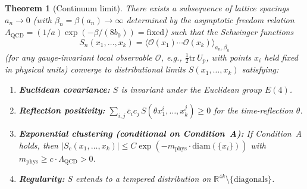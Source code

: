 \documentclass[11pt]{article}
\newtheorem{theorem}{Theorem}[section]
\theoremstyle{definition}
\newcommand{\tr}{\mathrm{tr}}
\newcommand{\R}{\mathbb{R}}
\newcommand{\Lam}{\Lambda_{\mathrm{QCD}}}
\begin{document}
\begin{theorem}[Continuum limit]\label{thm:continuum}
There exists a subsequence of lattice spacings $a_n\to 0$ (with
$\beta_n=\beta(a_n)\to\infty$ determined by the asymptotic freedom
relation $\Lam=(1/a)\exp(-\beta/(8b_0))=\mathrm{fixed}$) such that
the Schwinger functions
\[
S_n(x_1,\ldots,x_k)=\langle\mathcal{O}(x_1)\cdots\mathcal{O}(x_k)
\rangle_{a_n,\beta_n}
\]
(for any gauge-invariant local observable $\mathcal{O}$, e.g.,
$\frac{1}{2}\tr\,U_p$, with points $x_i$ held fixed in physical
units) converge to distributional limits $S(x_1,\ldots,x_k)$
satisfying:
\begin{enumerate}[nosep,label=(\roman*)]
\item \textbf{Euclidean covariance:} $S$ is invariant under the
Euclidean group $E(4)$.
\item \textbf{Reflection positivity:}
$\sum_{i,j}\bar c_i c_j\,S(\theta x_1^i,\ldots,x_k^j)\ge 0$
for the time-reflection $\theta$.
\item \textbf{Exponential clustering (conditional on Condition~A):}
If Condition~A holds, then
$|S_c(x_1,\ldots,x_k)|\le C\exp(-m_{\mathrm{phys}}\cdot
\mathrm{diam}(\{x_i\}))$ with $m_{\mathrm{phys}}\ge c\cdot\Lam>0$.
\item \textbf{Regularity:} $S$ extends to a tempered distribution
on $\R^{4k}\setminus\{\text{diagonals}\}$.
\end{enumerate}
\end{theorem}
\end{document}
